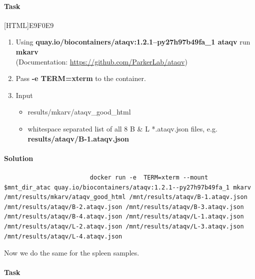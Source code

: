 \documentclass[12pt]{article}
\begin{document}
			\paragraph{Task}
			
				[HTML]{E9F0E9}{\parbox{\linewidth}{%
						\begin{enumerate}
						\item  Using \textbf{quay.io/biocontainers/ataqv:1.2.1--py27h97b49fa\_1 ataqv} run \textbf{mkarv}\\
						(Documentation: \url{https://github.com/ParkerLab/ataqv})
						\item  Pass \textbf{-e TERM=xterm} to the container.
						\item Input
						\begin{itemize}
							\item results/mkarv/ataqv\_good\_html 
							\item whitespace separated list of all 8 B \& L *.ataqv.json files, e.g.  \textbf{results/ataqv/B-1.ataqv.json}  
						\end{itemize}
						\end{enumerate}
				}}
			
			\paragraph{Solution}
				
				\begin{minipage}{\linewidth}
					\begin{lstlisting}
						docker run -e  TERM=xterm --mount $mnt_dir_atac quay.io/biocontainers/ataqv:1.2.1--py27h97b49fa_1 mkarv  /mnt/results/mkarv/ataqv_good_html /mnt/results/ataqv/B-1.ataqv.json /mnt/results/ataqv/B-2.ataqv.json /mnt/results/ataqv/B-3.ataqv.json /mnt/results/ataqv/B-4.ataqv.json /mnt/results/ataqv/L-1.ataqv.json /mnt/results/ataqv/L-2.ataqv.json /mnt/results/ataqv/L-3.ataqv.json /mnt/results/ataqv/L-4.ataqv.json
					\end{lstlisting}
				\end{minipage}
			
			Now we do the same for the spleen samples.
			
			\paragraph{Task}
			
\end{document}

